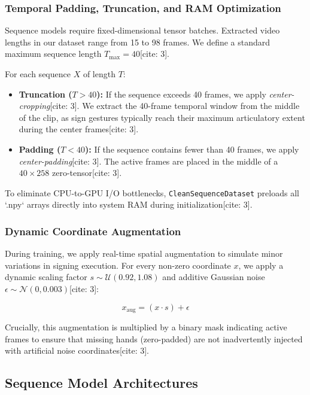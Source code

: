 \documentclass[12pt,a4paper]{article}
\begin{document}
\subsubsection{Temporal Padding, Truncation, and RAM Optimization}

Sequence models require fixed-dimensional tensor batches. Extracted video lengths in our dataset range from 15 to 98 frames. We define a standard maximum sequence length $T_{\text{max}} = 40$[cite: 3].

For each sequence $X$ of length $T$:
\begin{itemize}
    \item \textbf{Truncation ($T > 40$):} If the sequence exceeds 40 frames, we apply \textit{center-cropping}[cite: 3]. We extract the 40-frame temporal window from the middle of the clip, as sign gestures typically reach their maximum articulatory extent during the center frames[cite: 3].
    \item \textbf{Padding ($T < 40$):} If the sequence contains fewer than 40 frames, we apply \textit{center-padding}[cite: 3]. The active frames are placed in the middle of a $40 \times 258$ zero-tensor[cite: 3].
\end{itemize}

To eliminate CPU-to-GPU I/O bottlenecks, \texttt{CleanSequenceDataset} preloads all `.npy` arrays directly into system RAM during initialization[cite: 3].

\subsubsection{Dynamic Coordinate Augmentation}

During training, we apply real-time spatial augmentation to simulate minor variations in signing execution. For every non-zero coordinate $x$, we apply a dynamic scaling factor $s \sim \mathcal{U}(0.92, 1.08)$ and additive Gaussian noise $\epsilon \sim \mathcal{N}(0, 0.003)$[cite: 3]:

\begin{equation}
x_{\text{aug}} = (x \cdot s) + \epsilon
\end{equation}

Crucially, this augmentation is multiplied by a binary mask indicating active frames to ensure that missing hands (zero-padded) are not inadvertently injected with artificial noise coordinates[cite: 3].

\subsection{Sequence Model Architectures}
\end{document}
